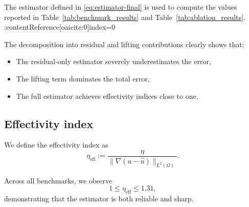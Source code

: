 The estimator defined in \eqref{eq:estimator-final} is used to compute
the values reported in Table~\ref{tab:benchmark_results} and
Table~\ref{tab:ablation_results}. :contentReference[oaicite:0]{index=0}

The decomposition into residual and lifting contributions clearly shows that:

\begin{itemize}
\item The residual-only estimator severely underestimates the error,
\item The lifting term dominates the total error,
\item The full estimator achieves effectivity indices close to one.
\end{itemize}

\subsection{Effectivity index}

We define the effectivity index as
\begin{equation}
\eta_{\mathrm{eff}} :=
\frac{\eta}{\|\nabla(u - \hat{u})\|_{L^2(\Omega)}}.
\end{equation}

Across all benchmarks, we observe
\[
1 \le \eta_{\mathrm{eff}} \le 1.31,
\]
demonstrating that the estimator is both reliable and sharp.